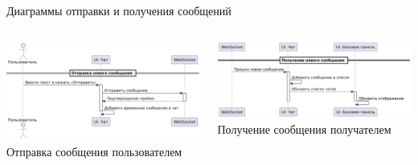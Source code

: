 \documentclass[aspectratio=169]{beamer}
\begin{document}
\begin{frame}{Диаграммы отправки и получения сообщений}
\vspace{0.5em}

\begin{columns}
    \begin{column}{0.5\textwidth}
        \centering
        \includegraphics[width=0.95\linewidth]{static/MessageSendDiagram.png} \\
        \small Отправка сообщения пользователем
    \end{column}
    \begin{column}{0.5\textwidth}
        \centering
        \includegraphics[width=0.95\linewidth]{static/MessageReceiveDiagram.png} \\
        \small Получение сообщения получателем
    \end{column}
\end{columns}
\end{frame}
\end{document}
